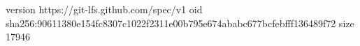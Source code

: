 version https://git-lfs.github.com/spec/v1
oid sha256:90611380e154fc8307c1022f2311e00b795e674ababc677bcfebfff136489f72
size 17946
